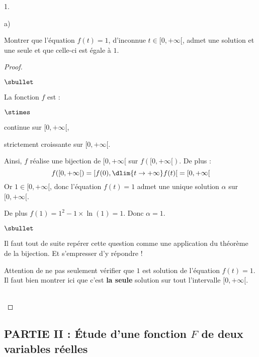 \begin{noliste}{1.}
\begin{noliste}{a)}
\end{noliste}

\item Montrer que l'équation $f(t)=1$, d'inconnue $t\in[0,+\infty[$, 
admet une solution et une seule et que celle-ci est égale à $1$.

\begin{proof}~%
  \begin{noliste}{$\sbullet$}
  \item La fonction $f$ est :
    \begin{noliste}{$\stimes$}
    \item continue sur $[0,+\infty[$,
    \item strictement croissante sur $[0,+\infty[$.
    \end{noliste}
    Ainsi, $f$ réalise une bijection de $[0,+\infty[$ sur
    $f([0,+\infty[)$. De plus :
    \[
    f([0,+\infty[) = \left[f(0), \dlim{t\to+\infty} f(t)\right[
    =[0,+\infty[
    \]
    Or $1\in [0, +\infty[$, donc l'équation $f(t)=1$ admet une unique
    solution $\alpha$ sur $[0,+\infty[$.
    
  \item De plus $f(1)=1^2-1\times \ln(1)=1$. Donc $\alpha=1$.
  \end{noliste}
  \conc{L'équation $f(t)=1$ admet $1$ comme unique solution sur
    $[0,+\infty[$.}
  \begin{remark}
    \begin{noliste}{$\sbullet$}
    \item Il faut tout de suite repérer cette question comme une
      application du théorème de la bijection. Et s'empresser d'y
      répondre !
      
    \item Attention de ne pas seulement vérifier que $1$ est solution
      de l'équation $f(t)=1$.\\
      Il faut bien montrer ici que c'est {\bf la seule} solution sur
      tout l'intervalle $[0,+\infty[$.
    \end{noliste}
  \end{remark}~\\[-1.4cm]
\end{proof}

\end{noliste}


\newpage


\subsection*{PARTIE II : Étude d'une fonction $F$ de deux 
variables réelles}

